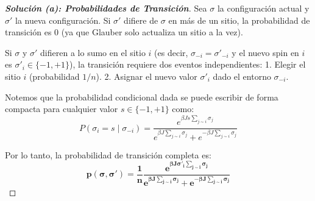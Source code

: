 \documentclass[10pt,a4paper]{article}
\begin{document}
\begin{proof}[\textbf{Solución (a): Probabilidades de Transición}]
    Sea $\sigma$ la configuración actual y $\sigma'$ la nueva configuración. Si $\sigma'$ difiere de $\sigma$ en más de un sitio, la probabilidad de transición es $0$ (ya que Glauber solo actualiza un sitio a la vez). 
    
    Si $\sigma$ y $\sigma'$ difieren a lo sumo en el sitio $i$ (es decir, $\sigma_{-i} = \sigma'_{-i}$ y el nuevo spin en $i$ es $\sigma'_i \in \{-1, +1\}$), la transición requiere dos eventos independientes:
    1. Elegir el sitio $i$ (probabilidad $1/n$).
    2. Asignar el nuevo valor $\sigma'_i$ dado el entorno $\sigma_{-i}$.
    
    Notemos que la probabilidad condicional dada se puede escribir de forma compacta para cualquier valor $s \in \{-1, +1\}$ como:
    \[ P(\sigma_i = s \mid \sigma_{-i}) = \frac{e^{\beta J s \sum_{j \sim i} \sigma_j}}{e^{\beta J \sum_{j \sim i} \sigma_j} + e^{-\beta J \sum_{j \sim i} \sigma_j}} \]
    
    Por lo tanto, la probabilidad de transición completa es:
    \[ \mathbf{p(\sigma, \sigma') = \frac{1}{n} \frac{e^{\beta J \sigma'_i \sum_{j \sim i} \sigma_j}}{e^{\beta J \sum_{j \sim i} \sigma_j} + e^{-\beta J \sum_{j \sim i} \sigma_j}}} \]
\end{proof}

\vspace{5mm}
\end{document}
